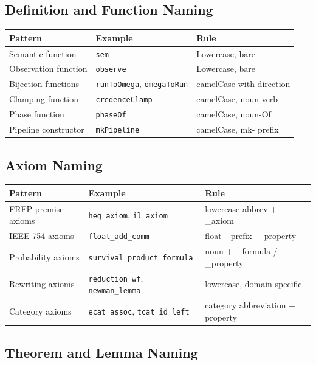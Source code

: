 \subsection*{Definition and Function Naming}

\begin{center}
\begin{tabular}{lll}
\toprule
Pattern & Example & Rule \\
\midrule
Semantic function & \texttt{sem} & Lowercase, bare \\
Observation function & \texttt{observe} & Lowercase, bare \\
Bijection functions & \texttt{runToOmega}, \texttt{omegaToRun} & camelCase with direction \\
Clamping function & \texttt{credenceClamp} & camelCase, noun-verb \\
Phase function & \texttt{phaseOf} & camelCase, noun-Of \\
Pipeline constructor & \texttt{mkPipeline} & camelCase, mk- prefix \\
\bottomrule
\end{tabular}
\end{center}

\subsection*{Axiom Naming}

\begin{center}
\begin{tabular}{lll}
\toprule
Pattern & Example & Rule \\
\midrule
FRFP premise axioms & \texttt{heg\_axiom}, \texttt{il\_axiom} & lowercase abbrev + \_axiom \\
IEEE 754 axioms & \texttt{float\_add\_comm} & float\_ prefix + property \\
Probability axioms & \texttt{survival\_product\_formula} & noun + \_formula / \_property \\
Rewriting axioms & \texttt{reduction\_wf}, \texttt{newman\_lemma} & lowercase, domain-specific \\
Category axioms & \texttt{ecat\_assoc}, \texttt{tcat\_id\_left} & category abbreviation + property \\
\bottomrule
\end{tabular}
\end{center}

\subsection*{Theorem and Lemma Naming}

